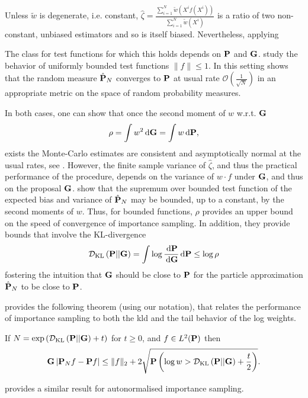Unless $\tilde w$ is degenerate, i.e. constant, $\hat\zeta = \frac{\sum_{i = 1}^N \tilde w (X^{i} f(X^{i}))}{\sum_{i = 1}^{N} \tilde w(X^{i})}$ is a ratio of two non-constant, unbiased estimators and so is itself biased. Nevertheless, applying 

The class for test functions for which this holds depends on $\P$ and $\G$. \citep{Agapiou2017Importance} study the behavior of uniformly bounded test functions $\lVert f \rVert \leq 1$. 
In this setting \citep{Agapiou2017Importance} shows that the random measure $\hat \P_N$ converges to $\P$ at usual rate $\mathcal O\left(\frac 1 {\sqrt{N}}\right)$ in an appropriate metric on the space of random probability measures. 


In both cases, one can show that once the second moment of $w$ w.r.t. $\G$ 
$$
\rho = \int w^{2}\d\G = \int w \d \P,
$$
exists the Monte-Carlo estimates are consistent and asymptotically normal at the usual rates, see \citep[Chapter 8]{Chopin2020Introduction}. 
However, the finite sample variance of $\hat\zeta$, and thus the practical performance of the procedure, depends on the variance of $w\cdot f$ under $\G$, and thus on the proposal $\G$. \citep{Agapiou2017Importance} show that the supremum over bounded test function of the expected bias and variance of $\hat \P_N$ may be bounded, up to a constant, by the second moments of $w$. Thus, for bounded functions, $\rho$ provides an upper bound on the speed of convergence of importance sampling. In addition, they provide bounds that involve the KL-divergence 
$$
\Dkl{\P}{\G} = \int \log \frac{\d \P}{\d \G} \d \P \leq \log \rho
$$
fostering the intuition that $\G$ should be close to $\P$ for the particle approximation $\hat\P_{N}$ to be close to $\P$.

\citep{Chatterjee2018Sample} provides the following theorem (using our notation), that relates the performance of importance sampling to both the \gls{kld} and the tail behavior of the log weights.
\begin{theorem}
    \label{thm:chatterje2018Thm1}
    If $N = \exp \left( \Dkl{\P}{\G} + t \right)$ for $ t\geq 0$, and $f \in L^{2}(\P)$ then
    $$
        \G \left\lvert \P_{N} f - \P f \right\rvert \leq \lVert f \rVert_{2} + 2 \sqrt{ \P \left( \log w > \Dkl{\P}{\G} + \frac{t}{2} \right)}.
    $$
\end{theorem}
\citep[Theorem 1.2]{Chatterjee2018Sample} provides a similar result for autonormalised importance sampling.

